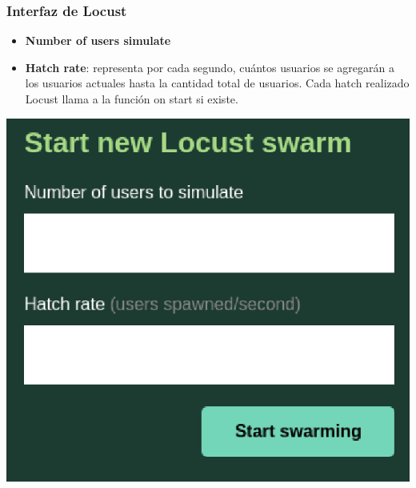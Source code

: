 \documentclass{beamer}
\theoremstyle{plain}
\theoremstyle{definition}
\theoremstyle{plain}
\theoremstyle{definition}
\theoremstyle{remark}
\theoremstyle{definition}
\begin{document}
\begin{frame}
\frametitle{Interfaz de Locust}
\begin{itemize}			
	\item \textbf{Number of users simulate}
	\item \textbf{Hatch rate}: representa por cada segundo, cuántos usuarios se agregarán a los usuarios actuales hasta la cantidad total de usuarios. Cada hatch realizado Locust llama a la función on start si existe.
\end{itemize}
	
	\centering
	\includegraphics[scale=0.15]{imagenes/locustInterfaz.png}
\end{frame}
\end{document}
